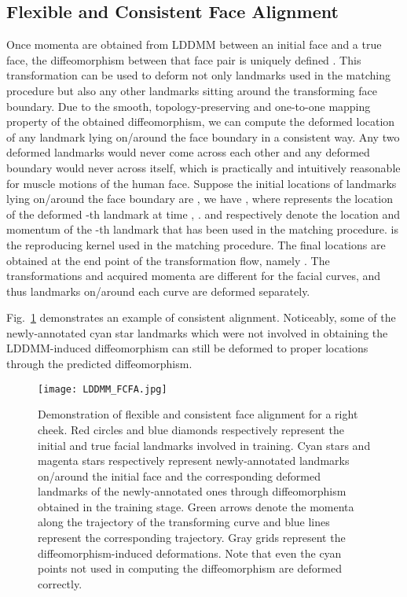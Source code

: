 \documentclass[10pt,twocolumn,letterpaper]{article}
\begin{document}
\subsection{Flexible and Consistent Face Alignment}\label{FCFA}
Once momenta are obtained from LDDMM between an initial face and a true face, the diffeomorphism between that face pair is uniquely defined \cite{glaunes2008large,joshi2000landmark}. This transformation can be used to deform not only landmarks used in the matching procedure but also any other landmarks sitting around the transforming face boundary. Due to the smooth, topology-preserving and one-to-one mapping property of the obtained diffeomorphism, we can compute the deformed location of any landmark lying on/around the face boundary in a consistent way. Any two deformed landmarks would never come across each other and any deformed boundary would never across itself, which is practically and intuitively reasonable for muscle motions of the human face. Suppose the initial locations of  landmarks lying on/around the face boundary are , we have , where  represents the location of the deformed -th landmark at time , .  and  respectively denote the location and momentum of the -th landmark that has been used in the matching procedure.  is the reproducing kernel used in the matching procedure. The final locations are obtained at the end point of the transformation flow, namely . The transformations and acquired momenta are different for the  facial curves, and thus landmarks on/around each curve are deformed separately.




Fig.~\ref{fig:LDDMM-consistent} demonstrates an example of consistent alignment. Noticeably, some of the newly-annotated cyan star landmarks which were not involved in obtaining the LDDMM-induced diffeomorphism can still be deformed to proper locations through the predicted diffeomorphism. 

\begin{figure}[thbp]
\begin{center}
   \texttt{[image: LDDMM\_FCFA.jpg]}
\end{center}
   \caption{Demonstration of flexible and consistent face alignment for a right cheek. Red circles and blue diamonds respectively represent the initial and true facial landmarks involved in training. Cyan stars and magenta stars respectively represent newly-annotated landmarks on/around the initial face and the corresponding deformed landmarks of the newly-annotated ones through diffeomorphism obtained in the training stage. Green arrows denote the momenta along the trajectory of the transforming curve and blue lines represent the corresponding trajectory. Gray grids represent the diffeomorphism-induced deformations. Note that even the cyan points not used in computing the diffeomorphism are deformed correctly.}
\label{fig:LDDMM-consistent}
\vspace{-5mm}
\end{figure}
\end{document}
